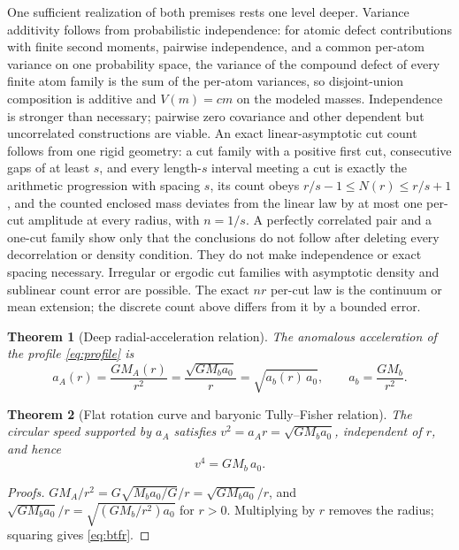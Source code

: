 \documentclass[11pt]{article}
\newtheorem{theorem}{Theorem}[section]
\begin{document}
One sufficient realization of both premises rests one level deeper. Variance
additivity follows from probabilistic independence: for atomic defect
contributions with finite second moments, pairwise independence, and a
common per-atom variance on one probability space, the variance of the
compound defect of every finite atom family is the sum of the per-atom
variances, so disjoint-union composition is additive and \(V(m)=cm\) on
the modeled masses. Independence is stronger than necessary; pairwise zero
covariance and other dependent but uncorrelated constructions are viable.
An exact linear-asymptotic cut count follows from one rigid geometry: a
cut family with a positive first cut, consecutive gaps of at least \(s\),
and every length-\(s\) interval meeting a cut is exactly the arithmetic
progression with spacing \(s\), its count obeys
\(r/s-1\le N(r)\le r/s+1\), and the counted enclosed mass deviates from
the linear law by at most one per-cut amplitude at every radius, with
\(n=1/s\). A perfectly correlated pair and a one-cut family show only that
the conclusions do not follow after deleting every decorrelation or density
condition. They do not make independence or exact spacing necessary.
Irregular or ergodic cut families with asymptotic density and sublinear count
error are possible. The exact \(nr\) per-cut law is the continuum or
mean extension; the discrete count above differs from it by a bounded error.

\begin{theorem}[Deep radial-acceleration relation]
\label{thm:rar}
The anomalous acceleration of the profile \eqref{eq:profile} is
\begin{equation}
a_A(r)=\frac{GM_A(r)}{r^2}=\frac{\sqrt{GM_ba_0}}{r}=\sqrt{a_b(r)\,a_0},
\qquad a_b=\frac{GM_b}{r^2}.
\label{eq:deep}
\end{equation}
\end{theorem}

\begin{theorem}[Flat rotation curve and baryonic Tully--Fisher relation]
\label{thm:btfr}
The circular speed supported by \(a_A\) satisfies
\(v^2=a_A r=\sqrt{GM_ba_0}\), independent of \(r\), and hence
\begin{equation}
v^4=GM_b\,a_0 .
\label{eq:btfr}
\end{equation}
\end{theorem}

\begin{proof}[Proofs]
\(GM_A/r^2=G\sqrt{M_ba_0/G}/r=\sqrt{GM_ba_0}/r\), and
\(\sqrt{GM_ba_0}/r=\sqrt{(GM_b/r^2)a_0}\) for \(r>0\). Multiplying by \(r\)
removes the radius; squaring gives \eqref{eq:btfr}.
\end{proof}
\end{document}
